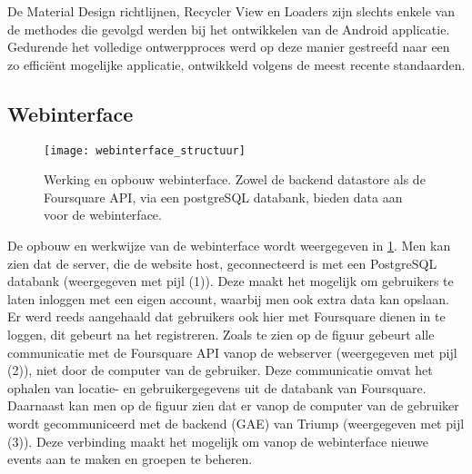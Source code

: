 De Material Design richtlijnen, Recycler View en Loaders zijn slechts enkele van de methodes die gevolgd werden bij het ontwikkelen van de Android applicatie. Gedurende het volledige ontwerpproces werd op deze manier gestreefd naar een zo efficiënt mogelijke applicatie, ontwikkeld volgens de meest recente standaarden. \cite{successapp}
\subsection{Webinterface}
\begin{figure}[H]
	\centering
	\texttt{[image: webinterface\_structuur]}
	\caption{Werking en opbouw webinterface. Zowel de backend datastore als de Foursquare API, via een postgreSQL databank, bieden data aan voor de webinterface. }
	\label{fig:Webinterface}
\end{figure}
De opbouw en werkwijze van de webinterface wordt weergegeven in \ref{fig:Webinterface}. Men kan zien dat de server, die de website host, geconnecteerd is met een PostgreSQL databank (weergegeven met pijl (1)). Deze maakt het mogelijk om gebruikers te laten inloggen met een eigen account, waarbij men ook extra data kan opslaan. Er werd reeds aangehaald dat gebruikers ook hier met Foursquare dienen in te loggen, dit gebeurt na het registreren. Zoals te zien op de figuur gebeurt alle communicatie met de Foursquare API vanop de webserver (weergegeven met pijl (2)), niet door de computer van de gebruiker. Deze communicatie omvat het ophalen van locatie- en gebruikergegevens uit de databank van Foursquare.
Daarnaast kan men op de figuur zien dat er vanop de computer van de gebruiker wordt gecommuniceerd met de backend (GAE) van Triump (weergegeven met pijl (3)). Deze verbinding maakt het mogelijk om vanop de webinterface nieuwe events aan te maken en groepen te beheren.


